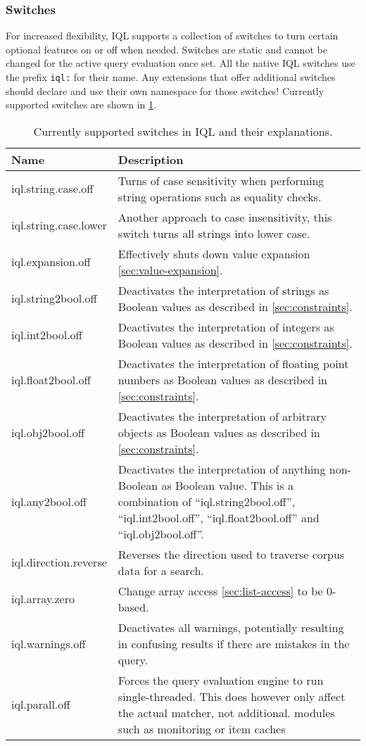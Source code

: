 \documentclass[11pt,a4paper,portrait]{article}
\newcommand{\iql}{IQL\xspace}
\begin{document}
\subsubsection{Switches}
\label{sec:json-ld-switches}
For increased flexibility, \iql supports a collection of switches to turn certain optional features on or off when needed. Switches are static and cannot be changed for the active query evaluation once set. All the native \iql switches use the prefix \texttt{iql:} for their name. Any extensions that offer additional switches should declare and use their own namespace for those switches! Currently supported switches are shown in \cref{tab:switches}.

\begin{table}[h]
\noindent\begin{tabular}{|p{}|p{}|}
\hline 
Name	& Description \\ 
\hline 
\hline
iql.string.case.off         & Turns of case sensitivity when performing string operations such as equality checks.  \\ 
\hline
iql.string.case.lower       & Another approach to case insensitivity, this switch turns all strings into lower case.  \\ 
\hline
iql.expansion.off           & Effectively shuts down value expansion \cref{sec:value-expansion}.  \\ 
\hline
iql.string2bool.off         & Deactivates the interpretation of strings as Boolean values as described in \cref{sec:constraints}.  \\ 
\hline
iql.int2bool.off            & Deactivates the interpretation of integers as Boolean values as described in \cref{sec:constraints}.  \\ 
\hline
iql.float2bool.off          & Deactivates the interpretation of floating point numbers as Boolean values as described in \cref{sec:constraints}.  \\ 
\hline
iql.obj2bool.off            & Deactivates the interpretation of arbitrary objects as Boolean values as described in \cref{sec:constraints}.  \\ 
\hline
iql.any2bool.off            & Deactivates the interpretation of anything non-Boolean as Boolean value. This is a combination of ``iql.string2bool.off'', ``iql.int2bool.off'', ``iql.float2bool.off'' and  ``iql.obj2bool.off''.  \\ 
\hline
iql.direction.reverse       & Reverses the direction used to traverse corpus data for a search.  \\ 
\hline
iql.array.zero              & Change array access \cref{sec:list-access} to be 0-based.  \\ 
\hline
iql.warnings.off            & Deactivates all warnings, potentially resulting in confusing results if there are mistakes in the query.  \\ 
\hline
iql.parall.off			  & Forces the query evaluation engine to run single-threaded. This does however only affect the actual matcher, not additional. modules such as monitoring or item caches  \\ 
\hline
\end{tabular}
\caption{Currently supported switches in \iql and their explanations.}
\label{tab:switches}
\end{table}
\end{document}
